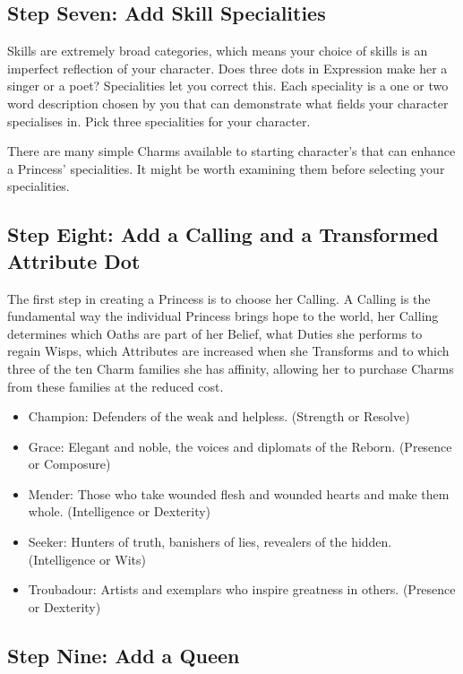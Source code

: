  \subsection*{Step Seven: Add Skill Specialities}
 
 Skills are extremely broad categories, which means your choice of skills is an imperfect reflection of your character. Does three dots in Expression make her a singer or a poet? Specialities let you correct this. Each speciality is a one or two word description chosen by you that can demonstrate what fields your character specialises in. Pick three specialities for your character. 
 
 There are many simple Charms available to starting character's that can enhance a Princess' specialities. It might be worth examining them before selecting your specialities.  

\subsection*{Step Eight: Add a Calling and a Transformed Attribute Dot}

The first step in creating a Princess is to choose her Calling. A Calling is the fundamental way the individual Princess brings hope to the world, her Calling determines which Oaths are part of her Belief, what Duties she performs to regain Wisps, which Attributes are increased when she Transforms and to which three of the ten Charm families she has affinity, allowing her to purchase Charms from these families at the reduced cost.

\begin{itemize}
\item Champion: Defenders of the weak and helpless. (Strength or Resolve)
\item Grace: Elegant and noble, the voices and diplomats of the Reborn. (Presence or Composure) 
\item Mender: Those who take wounded flesh and wounded hearts and make them whole. (Intelligence or Dexterity)
\item Seeker: Hunters of truth, banishers of lies, revealers of the hidden. (Intelligence or Wits)
\item Troubadour: Artists and exemplars who inspire greatness in others. (Presence or Dexterity)
\end{itemize}

\subsection*{Step Nine: Add a Queen}

